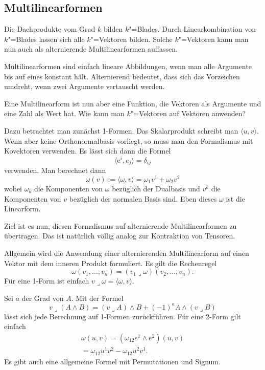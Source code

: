 \documentclass[a4paper,11pt,fleqn,twocolumn,twoside]{scrartcl}
\numberwithin{equation}{section}
\begin{document}
\subsection{Multilinearformen}

Die Dachprodukte vom Grad $k$ bilden $k$"=Blades. Durch
Linearkombination von $k$"=Blades lassen sich alle $k$"=Vektoren
bilden. Solche $k$"=Vektoren kann man nun auch als alternierende
Multilinearformen auffassen.

Multilinearformen sind einfach lineare Abbildungen, wenn man alle
Argumente bis auf eines konstant hält. Alternierend bedeutet, dass
sich das Vorzeichen umdreht, wenn zwei Argumente vertauscht werden.

Eine Multilinearform ist nun aber eine Funktion, die Vektoren als
Argumente und eine Zahl als Wert hat. Wie kann man $k$"=Vektoren
auf Vektoren anwenden?

Dazu betrachtet man zunächst 1-Formen. Das Skalarprodukt
schreibt man $\langle u,v\rangle$. Wenn aber keine Orthonormalbasis
vorliegt, so muss man den Formalismus mit Kovektoren verwenden.
Es lässt sich dann die Formel%
\begin{equation}
\langle\mathrm e^i,e_j\rangle = \delta_{ij}
\end{equation}
verwenden. Man berechnet dann%
\begin{equation}
\omega(v) := \langle\omega,v\rangle = \omega_1v^1 + \omega_2v^2
\end{equation}
wobei $\omega_k$ die Komponenten von $\omega$ bezüglich der
Dualbasis und $v^k$ die Komponenten von $v$ bezüglich der normalen
Basis sind. Eben dieses $\omega$ ist die Linearform.

Ziel ist es nun, diesen Formalismus auf alternierende
Multilinearformen zu übertragen. Das ist natürlich völlig analog
zur Kontraktion von Tensoren.

Allgemein wird die Anwendung einer alternierenden
Multilinearform auf einen Vektor mit dem inneren Produkt formuliert.
Es gilt die Rechenregel%
\begin{equation}
\omega(v_1,\ldots,v_n) = (v_1\lrcorner\omega)(v_2,\ldots,v_n).
\end{equation}
Für eine 1-Form ist einfach
$v\lrcorner\omega = \langle\omega,v\rangle$.

Sei $a$ der Grad von $A$. Mit der Formel%
\begin{equation}
v\lrcorner(A\wedge B)
= (v\lrcorner A)\wedge B + (-1)^a A\wedge(v\lrcorner B)
\end{equation}
lässt sich jede Berechnung auf 1-Formen zurückführen.
Für eine 2-Form gilt einfach%
\begin{gather*}
\omega(u,v) = (\omega_{12} e^1\wedge e^2)(u,v)\\
= \omega_{12} u^1 v^2 - \omega_{12} u^2 v^1.
\end{gather*}
Es gibt auch eine allgemeine Formel mit Permutationen
und Signum.
\end{document}
